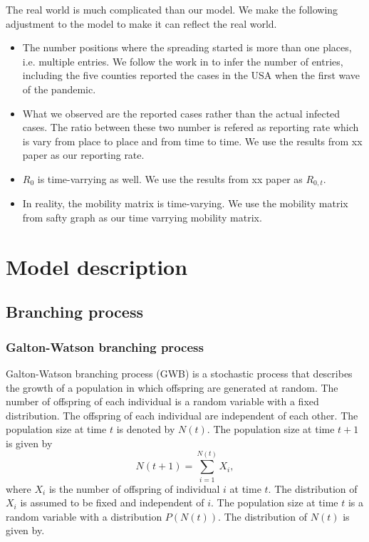 \documentclass{article}
\begin{document}
The real world is much complicated than our model. We make the following adjustment to the model to make it can reflect the real world.

\begin{itemize}
    \item The number positions where the spreading started is more than one places, i.e. multiple entries. We follow the work in to infer the number of entries, including the five counties reported the cases in the USA when the first wave of the pandemic.
    \item What we observed are the reported cases rather than the actual infected cases. The ratio between these two number is refered as reporting rate which is vary from place to place and from time to time. We use the results from xx paper as our reporting rate.
    \item $R_{0}$ is time-varrying as well. We use the results from xx paper as $R_{0,t}$.
    \item In reality, the mobility matrix is time-varying. We use the mobility matrix from safty graph as our time varrying mobility matrix.
\end{itemize}

\section{Model description}
\subsection{Branching process}
\subsubsection*{Galton-Watson branching process}

Galton-Watson branching process (GWB) is a stochastic process that describes the growth of a population in which offspring are generated at random. The number of offspring of each individual is a random variable with a fixed distribution. The offspring of each individual are independent of each other. The population size at time $t$ is denoted by $N(t)$. The population size at time $t+1$ is given by
\begin{equation}
N(t+1) = \sum_{i=1}^{N(t)} X_i,
\end{equation}
where $X_i$ is the number of offspring of individual $i$ at time $t$. The distribution of $X_i$ is assumed to be fixed and independent of $i$. The population size at time $t$ is a random variable with a distribution $P(N(t))$. The distribution of $N(t)$ is given by.
\end{document}
